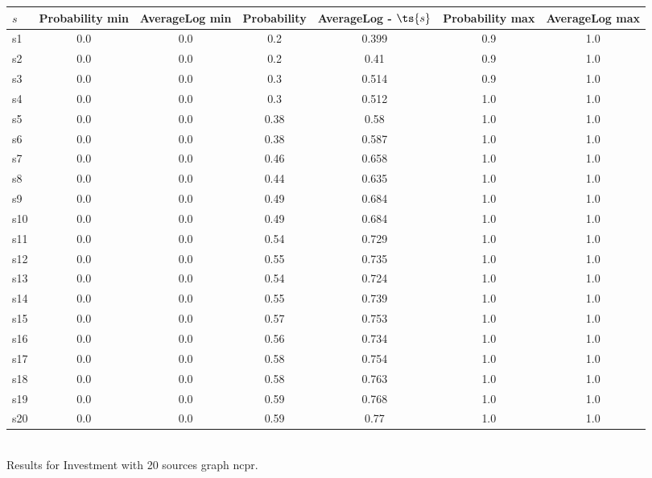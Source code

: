 \documentclass{article}
\begin{document}
\noindent\begin{tabular}{|l|c|c|c|c|c|c|}
\hline
$s$& Probability min & AverageLog min & Probability & AverageLog - $\ts{s}$ & Probability max & AverageLog max\\
\hline
s1 &0.0 & 0.0 & 0.2 & 0.399 & 0.9 & 1.0\\
\hline
s2 &0.0 & 0.0 & 0.2 & 0.41 & 0.9 & 1.0\\
\hline
s3 &0.0 & 0.0 & 0.3 & 0.514 & 0.9 & 1.0\\
\hline
s4 &0.0 & 0.0 & 0.3 & 0.512 & 1.0 & 1.0\\
\hline
s5 &0.0 & 0.0 & 0.38 & 0.58 & 1.0 & 1.0\\
\hline
s6 &0.0 & 0.0 & 0.38 & 0.587 & 1.0 & 1.0\\
\hline
s7 &0.0 & 0.0 & 0.46 & 0.658 & 1.0 & 1.0\\
\hline
s8 &0.0 & 0.0 & 0.44 & 0.635 & 1.0 & 1.0\\
\hline
s9 &0.0 & 0.0 & 0.49 & 0.684 & 1.0 & 1.0\\
\hline
s10 &0.0 & 0.0 & 0.49 & 0.684 & 1.0 & 1.0\\
\hline
s11 &0.0 & 0.0 & 0.54 & 0.729 & 1.0 & 1.0\\
\hline
s12 &0.0 & 0.0 & 0.55 & 0.735 & 1.0 & 1.0\\
\hline
s13 &0.0 & 0.0 & 0.54 & 0.724 & 1.0 & 1.0\\
\hline
s14 &0.0 & 0.0 & 0.55 & 0.739 & 1.0 & 1.0\\
\hline
s15 &0.0 & 0.0 & 0.57 & 0.753 & 1.0 & 1.0\\
\hline
s16 &0.0 & 0.0 & 0.56 & 0.734 & 1.0 & 1.0\\
\hline
s17 &0.0 & 0.0 & 0.58 & 0.754 & 1.0 & 1.0\\
\hline
s18 &0.0 & 0.0 & 0.58 & 0.763 & 1.0 & 1.0\\
\hline
s19 &0.0 & 0.0 & 0.59 & 0.768 & 1.0 & 1.0\\
\hline
s20 &0.0 & 0.0 & 0.59 & 0.77 & 1.0 & 1.0\\
\hline
\end{tabular}\\

\noindent Results for Investment with 20 sources graph ncpr.
\end{document}
